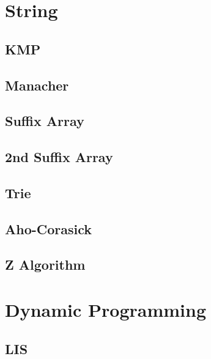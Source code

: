 \documentclass[10pt,landscape,a4paper,twocolumn]{article}
\begin{document}
\section{String}
\subsection{KMP}


\subsection{Manacher}


\subsection{Suffix Array}


\subsection{2nd Suffix Array}


\subsection{Trie}


\subsection{Aho-Corasick}


\subsection{Z Algorithm}


\section {Dynamic Programming}

\subsection{LIS}

\end{document}
